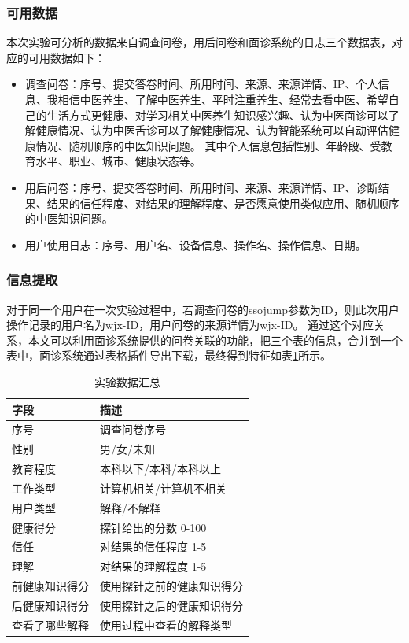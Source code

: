 \subsubsection{可用数据}
本次实验可分析的数据来自调查问卷，用后问卷和面诊系统的日志三个数据表，对应的可用数据如下：
\begin{itemize}
    \item 调查问卷：序号、提交答卷时间、所用时间、来源、来源详情、IP、个人信息、我相信中医养生、了解中医养生、平时注重养生、经常去看中医、希望自己的生活方式更健康、对学习相关中医养生知识感兴趣、认为中医面诊可以了解健康情况、认为中医舌诊可以了解健康情况、认为智能系统可以自动评估健康情况、随机顺序的中医知识问题。
    其中个人信息包括性别、年龄段、受教育水平、职业、城市、健康状态等。
    \item 用后问卷：序号、提交答卷时间、所用时间、来源、来源详情、IP、诊断结果、结果的信任程度、对结果的理解程度、是否愿意使用类似应用、随机顺序的中医知识问题。
    \item 用户使用日志：序号、用户名、设备信息、操作名、操作信息、日期。
\end{itemize}


\subsubsection{信息提取}
对于同一个用户在一次实验过程中，若调查问卷的ssojump参数为ID，则此次用户操作记录的用户名为wjx-ID，用户问卷的来源详情为wjx-ID。 
通过这个对应关系，本文可以利用面诊系统提供的问卷关联的功能，把三个表的信息，合并到一个表中，面诊系统通过表格插件导出下载，最终得到特征如表\ref{tab:exp_data}所示。


\begin{table}[h]
    \centering
    \caption{实验数据汇总}
    \begin{tabular}{ll}
        \toprule
        字段 & 描述 \\ 
        \midrule
        序号 & 调查问卷序号 \\
        性别 & 男/女/未知 \\
        教育程度 & 本科以下/本科/本科以上 \\
        工作类型 & 计算机相关/计算机不相关 \\
        用户类型 & 解释/不解释 \\
        健康得分 & 探针给出的分数 0-100 \\
        信任 & 对结果的信任程度 1-5 \\
        理解 & 对结果的理解程度 1-5 \\
        前健康知识得分 & 使用探针之前的健康知识得分 \\
        后健康知识得分 & 使用探针之后的健康知识得分 \\
        查看了哪些解释 & 使用过程中查看的解释类型 \\
        \bottomrule
    \end{tabular}
    \label{tab:exp_data}
\end{table}

